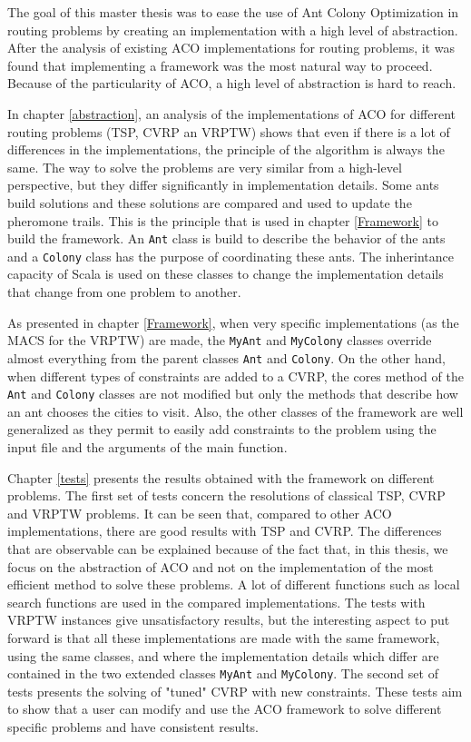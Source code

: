 The goal of this master thesis was to ease the use of Ant Colony Optimization in routing problems by creating an implementation with a high level of abstraction. After the analysis of existing ACO implementations for routing problems, it was found that implementing a framework was the most natural way to proceed. Because of the particularity of ACO, a high level of abstraction is hard to reach.

In chapter \ref{abstraction}, an analysis of the implementations of ACO for different routing problems (TSP, CVRP an VRPTW) shows that even if there is a lot of differences in the implementations, the principle of the algorithm is always the same. The way to solve the problems are very similar from a high-level perspective, but they differ significantly in implementation details. Some ants build solutions and these solutions are compared and used to update the pheromone trails. This is the principle that is used in chapter \ref{Framework} to build the framework. An \texttt{Ant} class is build to describe the behavior of the ants and a \texttt{Colony} class has the purpose of coordinating these ants. The inherintance capacity of Scala is used on these classes to change the implementation details that change from one problem to another.

 As presented in chapter \ref{Framework}, when very specific implementations (as the MACS for the VRPTW) are made, the \texttt{MyAnt} and \texttt{MyColony} classes override almost everything from the parent classes \texttt{Ant} and \texttt{Colony}. On the other hand, when different types of constraints are added to a CVRP, the cores method of the \texttt{Ant} and \texttt{Colony} classes are not modified but only the methods that describe how an ant chooses the cities to visit. Also, the other classes of the framework are well generalized as they permit to easily add constraints to the problem using the input file and the arguments of the main function.

Chapter \ref{tests} presents the results obtained with the framework on different problems. The first set of tests concern the resolutions of classical TSP, CVRP and VRPTW problems. It can be seen that, compared to other ACO implementations, there are good results with TSP and CVRP. The differences that are observable can be explained because of the fact that, in this thesis, we focus on the abstraction of ACO and not on the implementation of the most efficient method to solve these problems. A lot of different functions such as local search functions are used in the compared implementations. The tests with VRPTW instances give unsatisfactory results, but the interesting aspect to put forward is that all these implementations are made with the same framework, using the same classes, and where the implementation details which differ are contained in the two extended classes \texttt{MyAnt} and \texttt{MyColony}. The second set of tests presents the solving of "tuned" CVRP with new constraints. These tests aim to show that a user can modify and use the ACO framework to solve different specific problems and have consistent results. 


